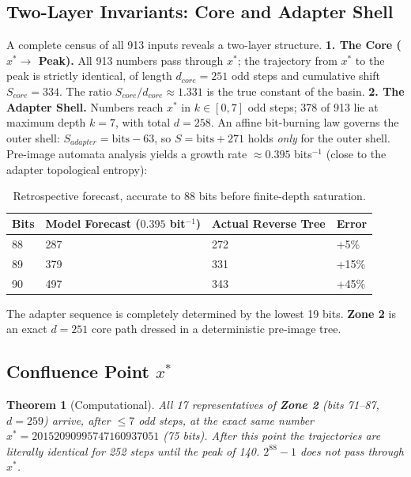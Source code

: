 \documentclass[12pt,a4paper]{article}
\newtheorem{theorem}{Theorem}[section]
\theoremstyle{remark}
\begin{document}
\subsection{Two-Layer Invariants: Core and Adapter Shell}
A complete census of all 913 inputs reveals a two-layer structure.
\textbf{1. The Core ($x^* \to$ Peak).} All 913 numbers pass through $x^*$; the trajectory from $x^*$ to the peak is strictly identical, of length $d_{core} = 251$ odd steps and cumulative shift $S_{core} = 334$. The ratio $S_{core}/d_{core} \approx 1.331$ is the true constant of the basin.
\textbf{2. The Adapter Shell.} Numbers reach $x^*$ in $k \in [0,7]$ odd steps; 378 of 913 lie at maximum depth $k=7$, with total $d = 258$. An affine bit-burning law governs the outer shell: $S_{adapter} = \mathrm{bits} - 63$, so $S = \mathrm{bits}+271$ holds \emph{only} for the outer shell. Pre-image automata analysis yields a growth rate $\approx 0.395$ bits$^{-1}$ (close to the adapter topological entropy):
\begin{table}[h]
\centering
\begin{tabular}{llll}
\toprule
\textbf{Bits} & \textbf{Model Forecast ($0.395$ bit$^{-1}$)} & \textbf{Actual Reverse Tree} & \textbf{Error} \\
\midrule
88 & 287 & 272 & +5\% \\
89 & 379 & 331 & +15\% \\
90 & 497 & 343 & +45\% \\
\bottomrule
\end{tabular}
\caption{Retrospective forecast, accurate to 88 bits before finite-depth saturation.}
\end{table}
The adapter sequence is completely determined by the lowest 19 bits. \textbf{Zone 2} is an exact $d=251$ core path dressed in a deterministic pre-image tree.

\subsection{Confluence Point $x^*$}
\begin{theorem}[Computational]
All 17 representatives of \textbf{Zone 2} (bits 71--87, $d=259$) arrive, after $\le7$ odd steps, at the exact same number
$x^* = 20152090995747160937051$ (75 bits). After this point the trajectories are literally identical for 252 steps until the peak of 140. $2^{88}-1$ does not pass through $x^*$.
\end{theorem}
\end{document}
